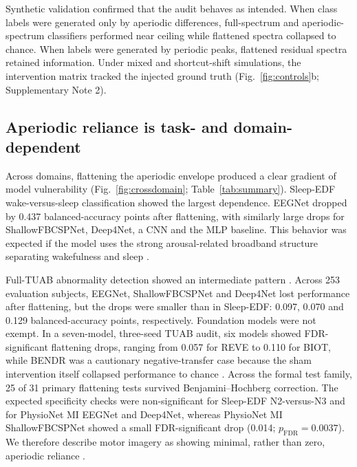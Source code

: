 \documentclass[pdflatex,sn-nature]{sn-jnl}
\begin{document}
Synthetic validation confirmed that the audit behaves as intended. When class labels were generated only by aperiodic differences, full-spectrum and aperiodic-spectrum classifiers performed near ceiling while flattened spectra collapsed to chance. When labels were generated by periodic peaks, flattened residual spectra retained information. Under mixed and shortcut-shift simulations, the intervention matrix tracked the injected ground truth (Fig.~\ref{fig:controls}b; Supplementary Note 2).

\subsection{Aperiodic reliance is task- and domain-dependent}

Across domains, flattening the aperiodic envelope produced a clear gradient of model vulnerability (Fig.~\ref{fig:crossdomain}; Table~\ref{tab:summary}). Sleep-EDF wake-versus-sleep classification showed the largest dependence. EEGNet dropped by 0.437 balanced-accuracy points after flattening, with similarly large drops for ShallowFBCSPNet, Deep4Net, a CNN and the MLP baseline. This behavior was expected if the model uses the strong arousal-related broadband structure separating wakefulness and sleep \cite{lendner2020electrophysiological,bodizs2021composite}.

Full-TUAB abnormality detection showed an intermediate pattern \cite{obeid2016tuh,gemein2020machine}. Across 253 evaluation subjects, EEGNet, ShallowFBCSPNet and Deep4Net lost performance after flattening, but the drops were smaller than in Sleep-EDF: 0.097, 0.070 and 0.129 balanced-accuracy points, respectively. Foundation models were not exempt. In a seven-model, three-seed TUAB audit, six models showed FDR-significant flattening drops, ranging from 0.057 for REVE to 0.110 for BIOT, while BENDR was a cautionary negative-transfer case because the sham intervention itself collapsed performance to chance \cite{yang2023biot,jiang2024labram,yue2024eegpt,wang2025cbramod,elouahidi2025reve,wang2025eegmamba,kostas2021bendr}. Across the formal test family, 25 of 31 primary flattening tests survived Benjamini--Hochberg correction. The expected specificity checks were non-significant for Sleep-EDF N2-versus-N3 and for PhysioNet MI EEGNet and Deep4Net, whereas PhysioNet MI ShallowFBCSPNet showed a small FDR-significant drop (0.014; $p_{\mathrm{FDR}}=0.0037$). We therefore describe motor imagery as showing minimal, rather than zero, aperiodic reliance \cite{schalk2004bci2000,pfurtscheller2001motor,wolpaw2002brain,blankertz2008optimizing}.
\end{document}
